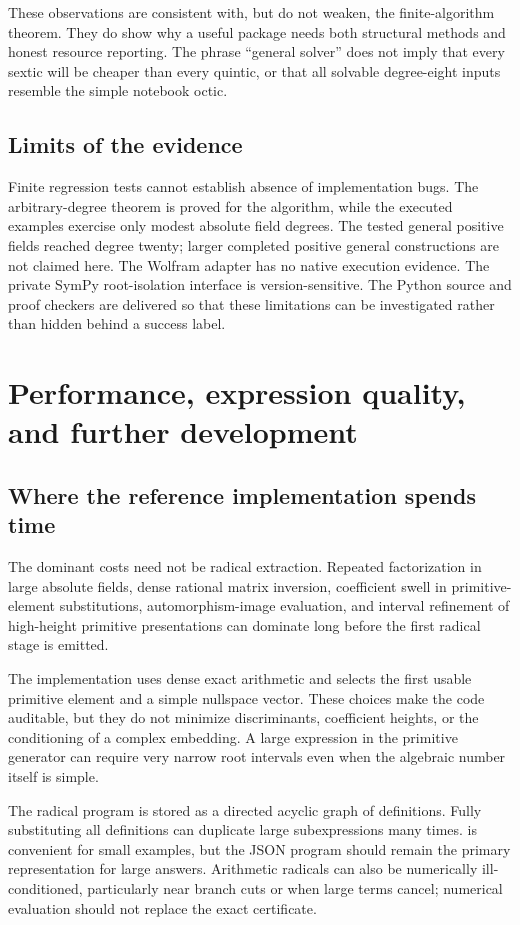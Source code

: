 \documentclass[11pt,letterpaper]{article}
\theoremstyle{definition}\newtheorem{definition}[theorem]{Definition}
\theoremstyle{remark}\newtheorem{remark}[theorem]{Remark}
\newcommand{\code}[1]{\texttt{\detokenize{#1}}}
\begin{document}
These observations are consistent with, but do not weaken, the finite-algorithm theorem. They do show why a useful package needs both structural methods and honest resource reporting. The phrase ``general solver'' does not imply that every sextic will be cheaper than every quintic, or that all solvable degree-eight inputs resemble the simple notebook octic.

\subsection{Limits of the evidence}
Finite regression tests cannot establish absence of implementation bugs. The arbitrary-degree theorem is proved for the algorithm, while the executed examples exercise only modest absolute field degrees. The tested general positive fields reached degree twenty; larger completed positive general constructions are not claimed here. The Wolfram adapter has no native execution evidence. The private SymPy root-isolation interface is version-sensitive. The Python source and proof checkers are delivered so that these limitations can be investigated rather than hidden behind a success label.

\section{Performance, expression quality, and further development}
\subsection{Where the reference implementation spends time}
The dominant costs need not be radical extraction. Repeated factorization in large absolute fields, dense rational matrix inversion, coefficient swell in primitive-element substitutions, automorphism-image evaluation, and interval refinement of high-height primitive presentations can dominate long before the first radical stage is emitted.

The implementation uses dense exact arithmetic and selects the first usable primitive element and a simple nullspace vector. These choices make the code auditable, but they do not minimize discriminants, coefficient heights, or the conditioning of a complex embedding. A large expression in the primitive generator can require very narrow root intervals even when the algebraic number itself is simple.

The radical program is stored as a directed acyclic graph of definitions. Fully substituting all definitions can duplicate large subexpressions many times. \code{selected_expression} is convenient for small examples, but the JSON program should remain the primary representation for large answers. Arithmetic radicals can also be numerically ill-conditioned, particularly near branch cuts or when large terms cancel; numerical evaluation should not replace the exact certificate.
\end{document}
